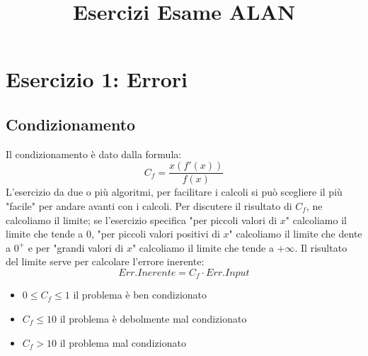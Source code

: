 \documentclass[10pt]{article}
\title{Esercizi Esame ALAN}
\author{}
\date{}
\begin{document}
\maketitle
\section{Esercizio 1: Errori}
\subsection{Condizionamento}
Il condizionamento è dato dalla formula:
\begin{equation*}
    C_{f}=\frac{x(f'(x))}{f(x)}
\end{equation*}
L'esercizio da due o più algoritmi, per facilitare i calcoli si può scegliere il più "facile" per andare avanti con i calcoli. Per discutere il risultato di $C_{f}$, ne calcoliamo il limite; se l'esercizio specifica "per piccoli valori di $x$" calcoliamo il limite che tende a 0, "per piccoli valori positivi di $x$" calcoliamo il limite che dente a $0^{+}$ e per "grandi valori di $x$" calcoliamo il limite che tende a $+\infty$. Il risultato del limite serve per calcolare l'errore inerente:
\begin{equation*}
    Err.Inerente = C_{f}\cdot Err.Input
\end{equation*}
\begin{itemize}
    \item $0\leq C_{f}\leq 1$ il problema è ben condizionato
    \item $C_{f}\leq 10$ il problema è debolmente mal condizionato
    \item $C_{f}>10$ il problema mal condizionato
\end{itemize}
\end{document}
